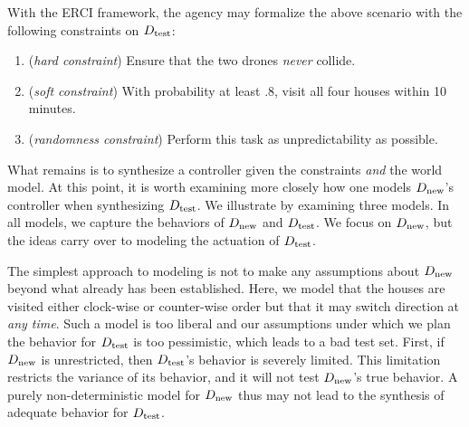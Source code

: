 With the ERCI framework, the agency may formalize the above scenario with the
following constraints on ${D_{\text{test}}}$:
\begin{enumerate}
\item (\emph{hard constraint}) Ensure that the two drones \emph{never} collide.
\item (\emph{soft constraint}) With probability at least $.8$, visit all four houses within 10 minutes.
\item (\emph{randomness constraint}) Perform this task as unpredictability as possible.
\end{enumerate}
What  remains is to synthesize a controller given the constraints
\emph{and} the world model. At this point, it is worth examining more
closely how one models ${D_{\text{new}}}$'s controller when synthesizing
${D_{\text{test}}}$. We illustrate by examining three models. In all models, we capture the behaviors of ${D_{\text{new}}}$ and ${D_{\text{test}}}$. We focus on ${D_{\text{new}}}$, but the ideas carry over to modeling the actuation of ${D_{\text{test}}}$.
%

The simplest approach to modeling is not to make any assumptions about  ${D_{\text{new}}}$ beyond what already has been established. Here, we model that the houses are visited either clock-wise or counter-wise order but that it may switch direction at \emph{any time}. 
Such a model is too liberal and our assumptions under which we plan the behavior for ${D_{\text{test}}}$ is too pessimistic, which leads to a bad test set.
First, if ${D_{\text{new}}}$ is unrestricted, then ${D_{\text{test}}}$'s behavior is severely limited. This limitation restricts the variance of its behavior, and it will not test ${D_{\text{new}}}$'s true behavior. 
A purely non-deterministic model for ${D_{\text{new}}}$ thus may not lead to the synthesis of adequate behavior for ${D_{\text{test}}}$. 

